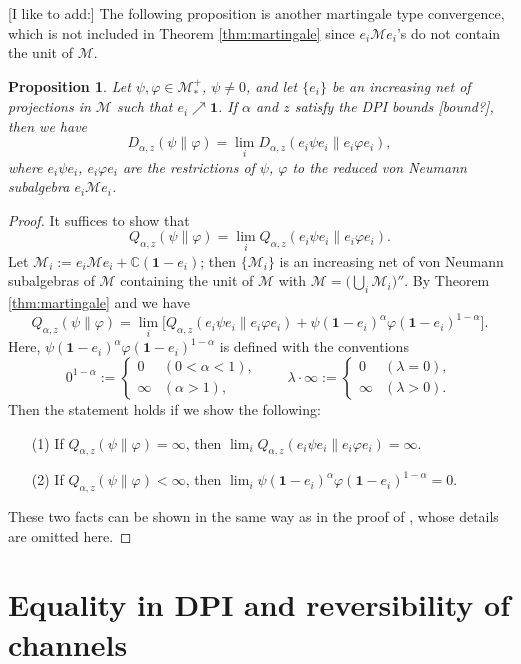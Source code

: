 \documentclass[12pt]{article}
\newtheorem{prop}[theorem]{Proposition}
\theoremstyle{definition}
\theoremstyle{remark}
\numberwithin{equation}{section}
\def\Me{\mathcal M}
\def\ffi{\varphi}
\def\1{\mathbf{1}}
\def\bC{\mathbb{C}}
\begin{document}
{\color{red}[I like to add:]
The following proposition is another martingale type convergence, which is not included in
Theorem \ref{thm:martingale} since $e_i\Me e_i$'s do not contain the unit of $\Me$.

\begin{prop}
Let $\psi,\varphi\in \Me_*^+$, $\psi\ne 0$, and let $\{e_i\}$ be an increasing net of projections in $\Me$
such that $e_i\nearrow\1$. If $\alpha$ and $z$ satisfy the DPI bounds [bound?], then we have
\[
D_{\alpha,z}(\psi\|\ffi)=\lim_iD_{\alpha,z}(e_i\psi e_i\|e_i\ffi e_i),
\]
where $e_i\psi e_i$, $e_i\ffi e_i$ are the restrictions of $\psi$, $\ffi$ to the reduced von Neumann
subalgebra $e_i\Me e_i$.
\end{prop}

\begin{proof}
It suffices to show that
\[
Q_{\alpha,z}(\psi\|\ffi)=\lim_iQ_{\alpha,z}(e_i\psi e_i\|e_i\ffi e_i).
\]
Let $\Me_i:=e_i\Me e_i+\bC(\1-e_i)$; then $\{\Me_i\}$ is an increasing net of von Neumann subalgebras
of $\Me$ containing the unit of $\Me$ with $\Me=\bigl(\bigcup_i\Me_i\bigr)''$. By
Theorem \ref{thm:martingale} and \cite[Theorems 1(ii) and 2(ii)]{kato2023onrenyi} we have
\[
Q_{\alpha,z}(\psi\|\ffi)
=\lim_i\bigl[Q_{\alpha,z}(e_i\psi e_i\|e_i\ffi e_i)+\psi(\1-e_i)^\alpha\ffi(\1-e_i)^{1-\alpha}\bigr].
\]
Here, $\psi(\1-e_i)^\alpha\ffi(\1-e_i)^{1-\alpha}$ is defined with the conventions
\[
0^{1-\alpha}:=\begin{cases}0 & (0<\alpha<1), \\ \infty & (\alpha>1),\end{cases}\qquad
\lambda\cdot\infty:=\begin{cases}0 & (\lambda=0), \\ \infty & (\lambda>0).\end{cases}
\]
Then the statement holds if we show the following:
\begin{itemize}
\item[(1)] If $Q_{\alpha,z}(\psi\|\ffi)=\infty$, then $\lim_iQ_{\alpha,z}(e_i\psi e_i\|e_i\ffi e_i)=\infty$.
\item[(2)] If $Q_{\alpha,z}(\psi\|\ffi)<\infty$, then $\lim_i\psi(\1-e_i)^\alpha\ffi(\1-e_i)^{1-\alpha}=0$.
\end{itemize}
These two facts can be shown in the same way as in the proof of \cite[Theorem 4.5]{hiai2018quantum},
whose details are omitted here.
\end{proof}}


\section{Equality in DPI and reversibility of channels}
\end{document}
